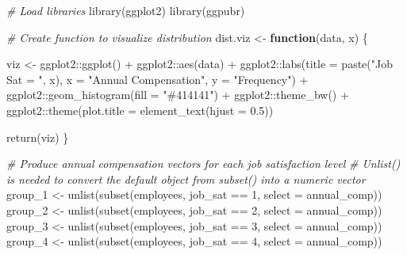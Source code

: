 \documentclass[
]{book}
\newenvironment{Shaded}{\begin{snugshade}}{\end{snugshade}}
\newcommand{\AttributeTok}[1]{\textcolor[rgb]{0.77,0.63,0.00}{#1}}
\newcommand{\CommentTok}[1]{\textcolor[rgb]{0.56,0.35,0.01}{\textit{#1}}}
\newcommand{\ControlFlowTok}[1]{\textcolor[rgb]{0.13,0.29,0.53}{\textbf{#1}}}
\newcommand{\DecValTok}[1]{\textcolor[rgb]{0.00,0.00,0.81}{#1}}
\newcommand{\FloatTok}[1]{\textcolor[rgb]{0.00,0.00,0.81}{#1}}
\newcommand{\FunctionTok}[1]{\textcolor[rgb]{0.00,0.00,0.00}{#1}}
\newcommand{\NormalTok}[1]{#1}
\newcommand{\OtherTok}[1]{\textcolor[rgb]{0.56,0.35,0.01}{#1}}
\newcommand{\SpecialCharTok}[1]{\textcolor[rgb]{0.00,0.00,0.00}{#1}}
\newcommand{\StringTok}[1]{\textcolor[rgb]{0.31,0.60,0.02}{#1}}
\begin{document}
\begin{Shaded}
\begin{Highlighting}[]
\CommentTok{\# Load libraries}
\FunctionTok{library}\NormalTok{(ggplot2)}
\FunctionTok{library}\NormalTok{(ggpubr)}

\CommentTok{\# Create function to visualize distribution}
\NormalTok{dist.viz }\OtherTok{\textless{}{-}} \ControlFlowTok{function}\NormalTok{(data, x) \{}
  
\NormalTok{viz }\OtherTok{\textless{}{-}}\NormalTok{ ggplot2}\SpecialCharTok{::}\FunctionTok{ggplot}\NormalTok{() }\SpecialCharTok{+} 
\NormalTok{       ggplot2}\SpecialCharTok{::}\FunctionTok{aes}\NormalTok{(data) }\SpecialCharTok{+} 
\NormalTok{       ggplot2}\SpecialCharTok{::}\FunctionTok{labs}\NormalTok{(}\AttributeTok{title =} \FunctionTok{paste}\NormalTok{(}\StringTok{"Job Sat = "}\NormalTok{, x), }\AttributeTok{x =} \StringTok{"Annual Compensation"}\NormalTok{, }\AttributeTok{y =} \StringTok{"Frequency"}\NormalTok{) }\SpecialCharTok{+} 
\NormalTok{       ggplot2}\SpecialCharTok{::}\FunctionTok{geom\_histogram}\NormalTok{(}\AttributeTok{fill =} \StringTok{"\#414141"}\NormalTok{) }\SpecialCharTok{+}
\NormalTok{       ggplot2}\SpecialCharTok{::}\FunctionTok{theme\_bw}\NormalTok{() }\SpecialCharTok{+}
\NormalTok{       ggplot2}\SpecialCharTok{::}\FunctionTok{theme}\NormalTok{(}\AttributeTok{plot.title =} \FunctionTok{element\_text}\NormalTok{(}\AttributeTok{hjust =} \FloatTok{0.5}\NormalTok{))}

  \FunctionTok{return}\NormalTok{(viz)}
\NormalTok{\}}

\CommentTok{\# Produce annual compensation vectors for each job satisfaction level}
\CommentTok{\# Unlist() is needed to convert the default object from subset() into a numeric vector}
\NormalTok{group\_1 }\OtherTok{\textless{}{-}} \FunctionTok{unlist}\NormalTok{(}\FunctionTok{subset}\NormalTok{(employees, job\_sat }\SpecialCharTok{==} \DecValTok{1}\NormalTok{, }\AttributeTok{select =}\NormalTok{ annual\_comp))}
\NormalTok{group\_2 }\OtherTok{\textless{}{-}} \FunctionTok{unlist}\NormalTok{(}\FunctionTok{subset}\NormalTok{(employees, job\_sat }\SpecialCharTok{==} \DecValTok{2}\NormalTok{, }\AttributeTok{select =}\NormalTok{ annual\_comp))}
\NormalTok{group\_3 }\OtherTok{\textless{}{-}} \FunctionTok{unlist}\NormalTok{(}\FunctionTok{subset}\NormalTok{(employees, job\_sat }\SpecialCharTok{==} \DecValTok{3}\NormalTok{, }\AttributeTok{select =}\NormalTok{ annual\_comp))}
\NormalTok{group\_4 }\OtherTok{\textless{}{-}} \FunctionTok{unlist}\NormalTok{(}\FunctionTok{subset}\NormalTok{(employees, job\_sat }\SpecialCharTok{==} \DecValTok{4}\NormalTok{, }\AttributeTok{select =}\NormalTok{ annual\_comp))}


\end{Highlighting}
\end{Shaded}
\end{document}
